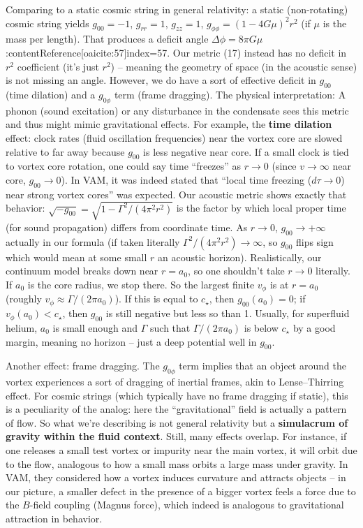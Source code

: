 \documentclass[12pt]{article}
\begin{document}
Comparing to a static cosmic string in general relativity: a static (non-rotating) cosmic string yields $g_{00}=-1$, $g_{rr}=1$, $g_{zz}=1$, $g_{\phi\phi} = (1-4G\mu)^2 r^2$ (if $\mu$ is the mass per length). That produces a deficit angle $\Delta \phi = 8\pi G \mu$:contentReference[oaicite:57]{index=57}. Our metric (17) instead has no deficit in $r^2$ coefficient (it’s just $r^2$) – meaning the geometry of space (in the acoustic sense) is not missing an angle. However, we do have a sort of effective deficit in $g_{00}$ (time dilation) and a $g_{0\phi}$ term (frame dragging). The physical interpretation: A phonon (sound excitation) or any disturbance in the condensate sees this metric and thus might mimic gravitational effects. For example, the \textbf{time dilation} effect: clock rates (fluid oscillation frequencies) near the vortex core are slowed relative to far away because $g_{00}$ is less negative near core. If a small clock is tied to vortex core rotation, one could say time “freezes” as $r\to 0$ (since $v\to \infty$ near core, $g_{00}\to 0$). In VAM, it was indeed stated that “local time freezing ($d\tau \to 0$) near strong vortex cores” was expected. Our acoustic metric shows exactly that behavior: $\sqrt{-g_{00}} = \sqrt{1 - \Gamma^2/(4\pi^2 r^2)}$ is the factor by which local proper time (for sound propagation) differs from coordinate time. As $r\to 0$, $g_{00}\to +\infty$ actually in our formula (if taken literally $\Gamma^2/(4\pi^2r^2)\to\infty$, so $g_{00}$ flips sign which would mean at some small $r$ an acoustic horizon). Realistically, our continuum model breaks down near $r=a_0$, so one shouldn’t take $r\to 0$ literally. If $a_0$ is the core radius, we stop there. So the largest finite $v_\phi$ is at $r = a_0$ (roughly $v_\phi \approx \Gamma/(2\pi a_0)$). If this is equal to $c_\star$, then $g_{00}(a_0)=0$; if $v_\phi(a_0)<c_\star$, then $g_{00}$ is still negative but less so than 1. Usually, for superfluid helium, $a_0$ is small enough and $\Gamma$ such that $\Gamma/(2\pi a_0)$ is below $c_\star$ by a good margin, meaning no horizon – just a deep potential well in $g_{00}$.

Another effect: frame dragging. The $g_{0\phi}$ term implies that an object around the vortex experiences a sort of dragging of inertial frames, akin to Lense–Thirring effect. For cosmic strings (which typically have no frame dragging if static), this is a peculiarity of the analog: here the “gravitational” field is actually a pattern of flow. So what we’re describing is not general relativity but a \textbf{simulacrum of gravity within the fluid context}. Still, many effects overlap. For instance, if one releases a small test vortex or impurity near the main vortex, it will orbit due to the flow, analogous to how a small mass orbits a large mass under gravity. In VAM, they considered how a vortex induces curvature and attracts objects – in our picture, a smaller defect in the presence of a bigger vortex feels a force due to the $B$-field coupling (Magnus force), which indeed is analogous to gravitational attraction in behavior.
\end{document}
